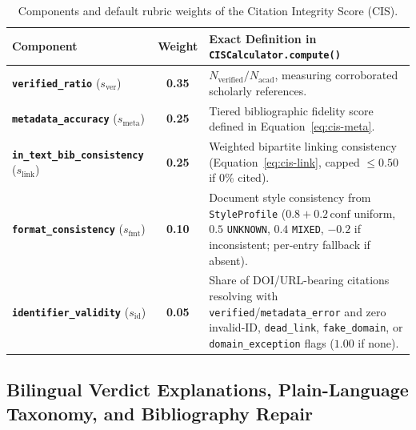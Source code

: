 {\setlength{\tabcolsep}{3.5pt}
\begin{table}[!htbp]
\centering
\caption{Components and default rubric weights of the Citation Integrity Score (CIS).}\label{tab:cis}
\begin{tabular}{|L{0.31}|C{0.11}|L{0.58}|}
\hline
\textbf{Component} & \textbf{Weight} & \textbf{Exact Definition in \texttt{CISCalculator.compute()}} \\
\hline
\textbf{\texttt{verified\_ratio}} ($s_{\text{ver}}$) & \textbf{0.35} & $N_{\text{verified}} / N_{\text{acad}}$, measuring corroborated scholarly references. \\
\hline
\textbf{\texttt{metadata\_accuracy}} ($s_{\text{meta}}$) & \textbf{0.25} & Tiered bibliographic fidelity score defined in Equation~\eqref{eq:cis-meta}. \\
\hline
\textbf{\texttt{in\_text\_bib\_consistency}} ($s_{\text{link}}$) & \textbf{0.25} & Weighted bipartite linking consistency (Equation~\eqref{eq:cis-link}, capped $\le 0.50$ if 0\% cited). \\
\hline
\textbf{\texttt{format\_consistency}} ($s_{\text{fmt}}$) & \textbf{0.10} & Document style consistency from \texttt{StyleProfile} ($0.8 + 0.2\,\text{conf}$ uniform, $0.5$ \texttt{UNKNOWN}, $0.4$ \texttt{MIXED}, $-0.2$ if inconsistent; per-entry fallback if absent). \\
\hline
\textbf{\texttt{identifier\_validity}} ($s_{\text{id}}$) & \textbf{0.05} & Share of DOI/URL-bearing citations resolving with \texttt{verified}/\texttt{metadata\_error} and zero invalid-ID, \texttt{dead\_link}, \texttt{fake\_domain}, or \texttt{domain\_exception} flags ($1.00$ if none). \\
\hline
\end{tabular}
\end{table}
}

\subsection{Bilingual Verdict Explanations, Plain-Language Taxonomy, and Bibliography Repair}

